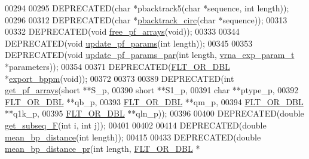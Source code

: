 \begin{DoxyCode}
00294 
00295 DEPRECATED(\textcolor{keywordtype}{char}    *pbacktrack5(\textcolor{keywordtype}{char} *sequence, \textcolor{keywordtype}{int} length));
00296 
00312 DEPRECATED(\textcolor{keywordtype}{char}    *\hyperlink{group__subopt__stochbt_ga00474051204ac9ad576b3e45174d03ff}{pbacktrack\_circ}(\textcolor{keywordtype}{char} *sequence));
00313 
00332 DEPRECATED(\textcolor{keywordtype}{void}  \hyperlink{group__pf__fold_gae73db3f49a94f0f72e067ecd12681dbd}{free\_pf\_arrays}(\textcolor{keywordtype}{void}));
00333 
00344 DEPRECATED(\textcolor{keywordtype}{void}  \hyperlink{group__pf__fold_ga384e927890f9c034ff09fa66da102d28}{update\_pf\_params}(\textcolor{keywordtype}{int} length));
00345 
00353 DEPRECATED(\textcolor{keywordtype}{void} \hyperlink{group__pf__fold_gaafe2d1b21f5418b123b088aa395e827d}{update\_pf\_params\_par}(\textcolor{keywordtype}{int} length, 
      \hyperlink{group__energy__parameters_structvrna__exp__param__s}{vrna\_exp\_param\_t} *parameters));
00354 
00371 DEPRECATED(\hyperlink{group__data__structures_ga31125aeace516926bf7f251f759b6126}{FLT\_OR\_DBL}  *\hyperlink{group__pf__fold_gac5ac7ee281aae1c5cc5898a841178073}{export\_bppm}(\textcolor{keywordtype}{void}));
00372 
00373 
00389 DEPRECATED(\textcolor{keywordtype}{int} \hyperlink{group__pf__fold_ga42faebdfce6f070c5f89adfc8427525c}{get\_pf\_arrays}(\textcolor{keywordtype}{short} **S\_p,
00390                   \textcolor{keywordtype}{short} **S1\_p,
00391                   \textcolor{keywordtype}{char} **ptype\_p,
00392                   \hyperlink{group__data__structures_ga31125aeace516926bf7f251f759b6126}{FLT\_OR\_DBL} **qb\_p,
00393                   \hyperlink{group__data__structures_ga31125aeace516926bf7f251f759b6126}{FLT\_OR\_DBL} **qm\_p,
00394                   \hyperlink{group__data__structures_ga31125aeace516926bf7f251f759b6126}{FLT\_OR\_DBL} **q1k\_p,
00395                   \hyperlink{group__data__structures_ga31125aeace516926bf7f251f759b6126}{FLT\_OR\_DBL} **qln\_p));
00396 
00400 DEPRECATED(\textcolor{keywordtype}{double} \hyperlink{part__func_8h_a189e2a1ec6cc32c53ea72f7543b0441e}{get\_subseq\_F}(\textcolor{keywordtype}{int} i, \textcolor{keywordtype}{int} j));
00401 
00402 
00414 DEPRECATED(\textcolor{keywordtype}{double}  \hyperlink{group__pf__fold_ga79cbc375af65f11609feb6b055269e7d}{mean\_bp\_distance}(\textcolor{keywordtype}{int} length));
00415 
00433 DEPRECATED(\textcolor{keywordtype}{double} \hyperlink{group__pf__fold_gad5ba36cef8d01cf4244cc09b9bf1ce1d}{mean\_bp\_distance\_pr}(\textcolor{keywordtype}{int} length, \hyperlink{group__data__structures_ga31125aeace516926bf7f251f759b6126}{FLT\_OR\_DBL} *

\end{DoxyCode}
